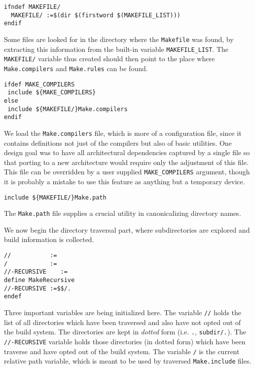 \documentclass[letterpaper]{article}
\begin{document}
\begin{verbatim}
ifndef MAKEFILE/
  MAKEFILE/ :=$(dir $(firstword $(MAKEFILE_LIST)))
endif
\end{verbatim}
Some files are looked for in the directory where the
\verb+Makefile+ was found, by extracting this information from the
built-in variable \verb+MAKEFILE_LIST+.  The \verb+MAKEFILE/+ variable
thus created should then point to the place where \verb+Make.compilers+
and \verb+Make.rules+ can be found.

\begin{verbatim}
ifdef MAKE_COMPILERS
 include ${MAKE_COMPILERS}
else
 include ${MAKEFILE/}Make.compilers
endif
\end{verbatim}
We load the \verb+Make.compilers+ file, which is more of a
configuration file, since it contains definitions not just of the
compilers but also of basic utilities.  One design goal was to have
all architectural dependencies captured by a single file so
that porting to a new architecture would require only the adjustment
of this file.  This file can be overridden by a user supplied
\verb+MAKE_COMPILERS+ argument, though it is probably a mistake
to use this feature as anything but a temporary device.

\begin{verbatim}
include ${MAKEFILE/}Make.path
\end{verbatim}
The \verb+Make.path+ file supplies a crucial utility in canonicalizing
directory names.

We now begin the directory traversal part, where subdirectories are
explored and build information is collected.

\begin{verbatim}
//           :=
/            :=
//-RECURSIVE    :=
define MakeRecursive
//-RECURSIVE :=$$/.
endef
\end{verbatim}
Three important variables are being initialized here.  The variable
\verb+//+ holds the list of all directories which have been traversed
and also have not opted out of the build system.  The directories are
kept in {\em dotted} form (i.e. \verb+.+, \verb+subdir/.+).  The
\verb+//-RECURSIVE+ variable holds those directories (in dotted form)
which have been traverse and have opted out of the build system.  The
variable \verb+/+ is the current relative path variable, which is
meant to be used by traversed \verb+Make.include+ files.
\end{document}
